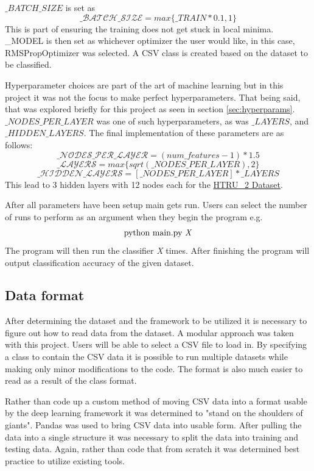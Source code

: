 \documentclass{article}
\begin{document}
    $\_BATCH\_SIZE$ is set as 
    \[\mathcal{\_BATCH\_SIZE}=max\{\_TRAIN*0.1, 1\}\]
    This is part of ensuring the training does not get stuck in local minima. 
    \_MODEL is then set as whichever optimizer the user would like, in this 
    case, RMSPropOptimizer was selected. A CSV class is created based on the 
    dataset to be classified. 

    Hyperparameter choices are part of the art of machine learning but in this 
    project it was not the focus to make perfect hyperparameters. That being 
    said, that was explored briefly for this project as seen in section 
    \ref{sec:hyperparams}. $\_NODES\_PER\_LAYER$ was one of such 
    hyperparameters, as was $\_LAYERS$, and $\_HIDDEN\_LAYERS$. The final 
    implementation of these parameters are as follows:
    \[\mathcal{\_NODES\_PER\_LAYER}=(num\_features - 1) * 1.5\]
    \[\mathcal{\_LAYERS}=max\{sqrt(\_NODES\_PER\_LAYER), 2\}\]
    \[\mathcal{\_HIDDEN\_LAYERS}=[\_NODES\_PER\_LAYER] * \_LAYERS\]
    This lead to 3 hidden layers with 12 nodes each for the \href{https://archive.ics.uci.edu/ml/datasets/HTRU2}{HTRU\_2 Dataset}.

    After all parameters have been setup main gets run. Users can select the 
    number of runs to perform as an argument when they begin the program e.g. 
    \[\textnormal{python\ main.py \textit{X}}\]  
    The program will then run the classifier \textit{X} times. After finishing 
    the program will output classification accuracy of the given dataset.



\subsection{Data format}
    After determining the dataset and the framework to be utilized it is 
    necessary to figure out how to read data from the dataset. A modular 
    approach was taken with this project. Users will be able to select a CSV 
    file to load in. By specifying a class to contain the CSV data it is 
    possible to run multiple datasets while making only minor modifications to 
    the code. The format is also much easier to read as a result of the class 
    format.

    Rather than code up a custom method of moving CSV data into a format usable 
    by the deep learning framework it was determined to "stand on the shoulders 
    of giants". Pandas was used to bring CSV data into usable form. After 
    pulling the data into a single structure it was necessary to split the data 
    into training and testing data. Again, rather than code that from scratch 
    it was determined best practice to utilize existing tools. 
\end{document}
